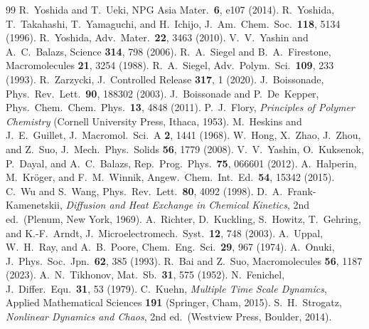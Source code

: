 \documentclass[aps,pre,reprint,superscriptaddress,longbibliography,floatfix]{revtex4-2}
\begin{document}
\begin{thebibliography}{99}
 R.~Yoshida and T.~Ueki, NPG Asia Mater.\ \textbf{6}, e107 (2014).
 R.~Yoshida, T.~Takahashi, T.~Yamaguchi, and H.~Ichijo, J.~Am.\ Chem.\ Soc.\ \textbf{118}, 5134 (1996).
 R.~Yoshida, Adv.\ Mater.\ \textbf{22}, 3463 (2010).
 V.~V.~Yashin and A.~C.~Balazs, Science \textbf{314}, 798 (2006).
 R.~A.~Siegel and B.~A.~Firestone, Macromolecules \textbf{21}, 3254 (1988).
 R.~A.~Siegel, Adv.\ Polym.\ Sci.\ \textbf{109}, 233 (1993).
 R.~Zarzycki, J.\ Controlled Release \textbf{317}, 1 (2020).
 J.~Boissonade, Phys.\ Rev.\ Lett.\ \textbf{90}, 188302 (2003).
 J.~Boissonade and P.~De~Kepper, Phys.\ Chem.\ Chem.\ Phys.\ \textbf{13}, 4848 (2011).
 P.~J.~Flory, \textit{Principles of Polymer Chemistry} (Cornell University Press, Ithaca, 1953).
 M.~Heskins and J.~E.~Guillet, J.\ Macromol.\ Sci.\ A \textbf{2}, 1441 (1968).
 W.~Hong, X.~Zhao, J.~Zhou, and Z.~Suo, J.\ Mech.\ Phys.\ Solids \textbf{56}, 1779 (2008).
 V.~V.~Yashin, O.~Kuksenok, P.~Dayal, and A.~C.~Balazs, Rep.\ Prog.\ Phys.\ \textbf{75}, 066601 (2012).
 A.~Halperin, M.~Kr\"oger, and F.~M.~Winnik, Angew.\ Chem.\ Int.\ Ed.\ \textbf{54}, 15342 (2015).
 C.~Wu and S.~Wang, Phys.\ Rev.\ Lett.\ \textbf{80}, 4092 (1998).
 D.~A.~Frank-Kamenetskii, \textit{Diffusion and Heat Exchange in Chemical Kinetics}, 2nd ed.\ (Plenum, New York, 1969).
 A.~Richter, D.~Kuckling, S.~Howitz, T.~Gehring, and K.-F.~Arndt, J.\ Microelectromech.\ Syst.\ \textbf{12}, 748 (2003).
 A.~Uppal, W.~H.~Ray, and A.~B.~Poore, Chem.\ Eng.\ Sci.\ \textbf{29}, 967 (1974).
 A.~Onuki, J.\ Phys.\ Soc.\ Jpn.\ \textbf{62}, 385 (1993).
 R.~Bai and Z.~Suo, Macromolecules \textbf{56}, 1187 (2023).
 A.~N.~Tikhonov, Mat.\ Sb.\ \textbf{31}, 575 (1952).
 N.~Fenichel, J.\ Differ.\ Equ.\ \textbf{31}, 53 (1979).
 C.~Kuehn, \textit{Multiple Time Scale Dynamics}, Applied Mathematical Sciences \textbf{191} (Springer, Cham, 2015).
 S.~H.~Strogatz, \textit{Nonlinear Dynamics and Chaos}, 2nd ed.\ (Westview Press, Boulder, 2014).
\end{thebibliography}
\end{document}
